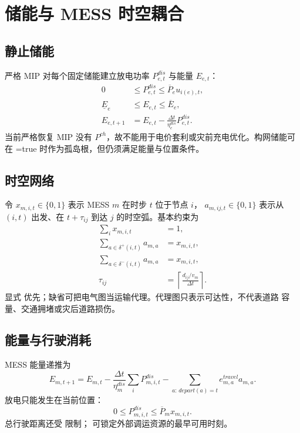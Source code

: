 \section{储能与 MESS 时空耦合}\label{sec:res-mess}

\subsection{静止储能}
严格 MIP 对每个固定储能建立放电功率 $P^{dis}_{e,t}$ 与能量 $E_{e,t}$：
\begin{align}
 0&\le P^{dis}_{e,t}\le \overline P_e u_{i(e),t},\\
 \underline E_e&\le E_{e,t}\le\overline E_e,\\
 E_{e,t+1}&=E_{e,t}-\frac{\Delta t}{\eta_e^{dis}}P^{dis}_{e,t}.
\end{align}
当前严格恢复 MIP 没有 $P^{ch}$，故不能用于电价套利或灾前充电优化。构网储能可在
=true 时作为孤岛根，但仍须满足能量与位置条件。

\subsection{时空网络}
令 $x_{m,i,t}\in\{0,1\}$ 表示 MESS $m$ 在时步 $t$ 位于节点 $i$，
$a_{m,ij,t}\in\{0,1\}$ 表示从 $(i,t)$ 出发、在 $t+\tau_{ij}$ 到达 $j$ 的时空弧。基本约束为
\begin{align}
 \sum_i x_{m,i,t}&=1,\\
 \sum_{a\in\delta^+(i,t)}a_{m,a}&=x_{m,i,t},\\
 \sum_{a\in\delta^-(i,t)}a_{m,a}&=x_{m,i,t},\\
 \tau_{ij}&=\left\lceil\frac{d_{ij}/v_m}{\Delta t}\right\rceil.
\end{align}
显式  优先；缺省可把电气图当运输代理。代理图只表示可达性，不代表道路
容量、交通拥堵或灾后道路损伤。

\subsection{能量与行驶消耗}
MESS 能量递推为
\begin{equation}
 E_{m,t+1}=E_{m,t}-\frac{\Delta t}{\eta_m^{dis}}
 \sum_iP^{dis}_{m,i,t}-\sum_{a:\,depart(a)=t}e^{travel}_{m,a}a_{m,a}.
\end{equation}
放电只能发生在当前位置：
\begin{equation}
 0\le P^{dis}_{m,i,t}\le\overline P_m x_{m,i,t}.
\end{equation}
总行驶距离还受  限制；
 可锁定外部调运资源的最早可用时刻。

